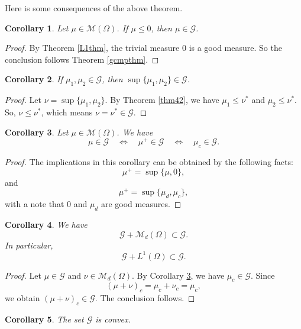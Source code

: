 \documentclass[a4paper, 11pt]{report}
\newtheorem{crr}{Corollary}[chapter]
\theoremstyle{definition}\newtheorem*{rmk}{Remark}
\begin{document}
Here is some consequences of the above theorem.

\begin{crr}
Let $\mu \in \mathcal{M}(\Omega)$. If $\mu \leq 0$, then $\mu \in \mathcal{G}$.
\end{crr}

\begin{proof}
By Theorem \ref{L1thm}, the trivial measure $0$ is a good measure. So the conclusion follows Theorem \ref{gcmpthm}.
\end{proof}

\begin{crr}\label{crr45}
If $\mu_1, \mu_2 \in \mathcal{G}$, then $\sup \{ \mu_1, \mu_2 \}\in \mathcal{G}$.
\end{crr}

\begin{proof}
Let $\nu = \sup \{ \mu_1, \mu_2 \}$. By Theorem \ref{thm42}, we have $\mu_1 \le \nu^*$ and $\mu_2 \le \nu^*$. So, $\nu \le \nu^*$, which means $\nu =\nu^* \in \mathcal{G}$.
\end{proof}

\begin{crr}\label{crr46}
Let $\mu \in \mathcal{M}(\Omega)$. We have
\[
\mu \in \mathcal{G} \quad \Leftrightarrow \quad \mu^+ \in \mathcal{G} \quad \Leftrightarrow \quad \mu_c \in \mathcal{G}.
\]
\end{crr}

\begin{proof}
The implications in this corollary can be obtained by the following facts:
\[
\mu^+ = \sup\{\mu, 0\},
\]
and
\[
\mu^+ = \sup\{\mu_d, \mu_c\},
\]
with a note that $0$ and $\mu_d$ are good measures.
\end{proof}

\begin{crr}\label{crr47}
We have
\[
\mathcal{G} + \mathcal{M}_d(\Omega) \subset \mathcal{G}.
\]
In particular,
\[
\mathcal{G} + L^1(\Omega) \subset \mathcal{G}.
\]
\end{crr}

\begin{proof}
Let $\mu \in \mathcal{G}$ and $\nu \in \mathcal{M}_d(\Omega)$. By Corollary \ref{crr46}, we have $\mu_c \in \mathcal{G}$. Since
\[
(\mu+\nu)_c = \mu_c + \nu_c = \mu_c,
\]
we obtain $(\mu+\nu)_c \in \mathcal{G}$. The conclusion follows. 
\end{proof}

\begin{crr}
The set $\mathcal{G}$ is convex.
\end{crr}
\end{document}
